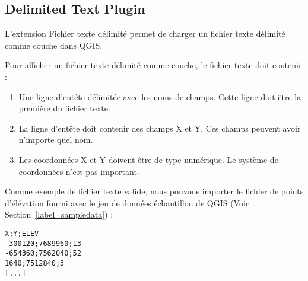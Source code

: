 
\subsection{Delimited Text Plugin}\label{label_dltext}    


L'extension Fichier texte d\'elimit\'e permet de charger un fichier texte d\'elimit\'e comme couche dans QGIS.


Pour afficher un fichier texte d\'elimit\'e comme couche, le fichier texte doit contenir :

\begin{enumerate}      
\item Une ligne d'ent\^ete d\'elimit\'ee avec les noms de champs. Cette ligne doit \^etre la premi\`ere du fichier texte.
\item La ligne d'ent\^ete doit contenir des champs X et Y. Ces champs peuvent avoir n'importe quel nom.
\item Les coordonn\'ees X et Y doivent \^etre de type num\'erique. Le syst\`eme de coordonn\'ees n'est pas important.
\end{enumerate}

Comme exemple de fichier texte valide, nous pouvons importer le fichier de points d'\'el\'evation
 fourni avec le jeu de donn\'ees \'echantillon de QGIS (Voir Section~\ref{label_sampledata}) :

\begin{verbatim} 
X;Y;ELEV
-300120;7689960;13
-654360;7562040;52
1640;7512840;3
[...]
\end{verbatim}

